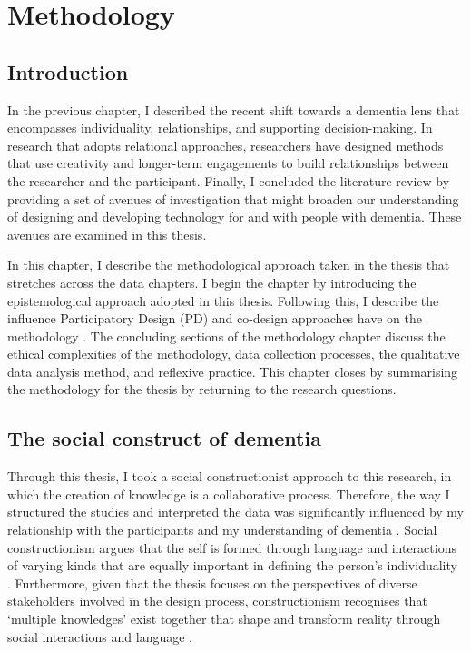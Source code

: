 \chapter{Methodology}
\label{Methodology}

\section{Introduction}
\label{Method:Intro}
In the previous chapter, I described the recent shift towards a dementia lens that encompasses individuality, relationships, and supporting decision-making. In research that adopts relational approaches, researchers have designed methods that use creativity and longer-term engagements to build relationships between the researcher and the participant. Finally, I concluded the literature review by providing a set of avenues of investigation that might broaden our understanding of designing and developing technology for and with people with dementia. These avenues are examined in this thesis.

In this chapter, I describe the methodological approach taken in the thesis that stretches across the data chapters. I begin the chapter by introducing the epistemological approach adopted in this thesis. Following this, I describe the influence Participatory Design (PD) and co-design approaches have on the methodology \citep{duarte2018participatory}. The concluding sections of the methodology chapter discuss the ethical complexities of the methodology, data collection processes, the qualitative data analysis method, and reflexive practice. This chapter closes by summarising the methodology for the thesis by returning to the research questions.  

\section{The social construct of dementia}
\label{social construct}
Through this thesis, I took a social constructionist approach to this research, in which the creation of knowledge is a collaborative process. Therefore, the way I structured the studies and interpreted the data was significantly influenced by my relationship with the participants and my understanding of dementia \citep{surr2006preservation}. Social constructionism argues that the self is formed through language and interactions of varying kinds that are equally important in defining the person's individuality \citep{sarup1996identity}. Furthermore, given that the thesis focuses on the perspectives of diverse stakeholders involved in the design process, constructionism recognises that `multiple knowledges' exist together that shape and transform reality through social interactions and language \citep{mckeown2015you}.

